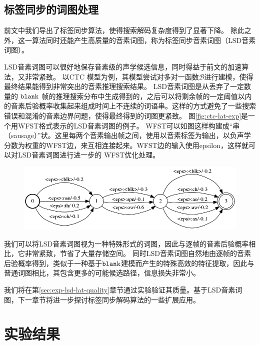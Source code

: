 \subsection{标签同步的词图处理}
\label{chap:lsd-lsd-lattice}

前文中我们导出了标签同步算法，使得搜索解码复杂度得到了显著下降。
除此之外，这一算法同时还能产生高质量的音素词图，称为标签同步音素词图（LSD音素词图）。

LSD音素词图可以很好地保存音素级的声学候选信息，同时得益于前文的加速算法，又非常紧致。
%
以CTC 模型为例，其模型尝试对多对一函数$\mathcal{B}$进行建模，使得最终结果能得到非常突出的音素推理搜索结果。
LSD音素词图是从丢弃了一定数量的 $\tt blank$ 帧的推理搜索分布中生成得到的，之后可以将剩余帧的一定阈值以内的音素后验概率收集起来组成时间上不连续的词语串。这样的方式避免了一些搜索错误和混淆的音素边界问题，使得最终得到的词图更紧致。
%
图\ref{fig:ctc-lat-exp}是一个用WFST格式表示的LSD音素词图的例子。
WFST可以如图这样构建成“串（sausage）”状。这里每两个音素输出帧之间，使用以音素标签为输出，以负声学分数为权重的WFST边，来互相连接起来。WFST边的输入使用epsilon，这样就可以对LSD音素词图进行进一步的 WFST优化处理。

\begin{figure}[!htp]
  \centering
    \captionstyle{\centering}
    \includegraphics[width=\textwidth]{figure/ctc_lat.png}
\end{figure}

我们可以将LSD音素词图视为一种特殊形式的词图，因此与逐帧的音素后验概率相比，它非常紧致，节省了大量存储空间。
同时LSD音素词图自然地由逐帧的音素后验概率得到，类似于一种基于$\tt blank$建模而产生的特殊高效的特征提取，因此与普通词图相比，其包含更多的可能候选路径，信息损失非常小。

我们将在第\ref{sec:exp-lsd-lat-quality}章节通过实验验证其质量。基于LSD音素词图，下一章节将进一步探讨标签同步解码算法的一些扩展应用。

\section{实验结果}
\label{chap:lsd-exp}

